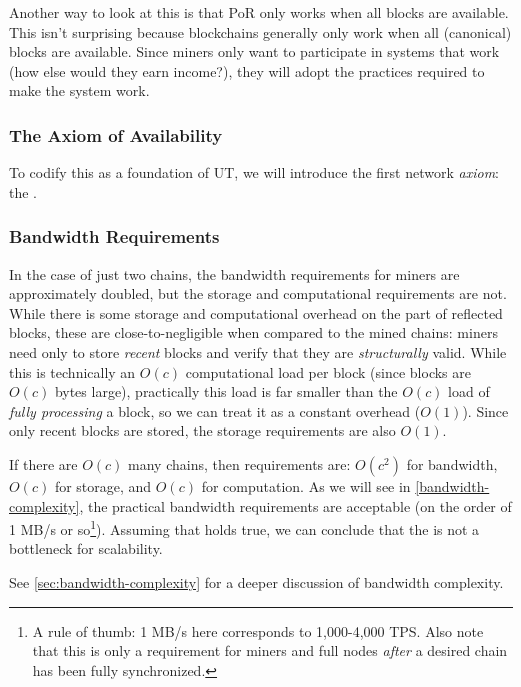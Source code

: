Another way to look at this is that PoR only works when all blocks are available.
This isn't surprising because blockchains generally only work when all (canonical) blocks are available.
Since miners only want to participate in systems that work (how else would they earn income?), they will adopt the practices required to make the system work.

\subsubsection{The Axiom of Availability}

To codify this as a foundation of UT, we will introduce the first network \emph{axiom}: the \AxiomOfAvailability{}.




\subsubsection{Bandwidth Requirements}

In the case of just two chains, the bandwidth requirements for \cL miners are approximately doubled, but the storage and computational requirements are not.
While there is some storage and computational overhead on the part of reflected \cR blocks, these are close-to-negligible when compared to the mined chains: miners need only to store \emph{recent} \cR blocks and verify that they are \emph{structurally} valid.
While this is technically an $O(c)$ computational load per block (since blocks are $O(c)$ bytes large), practically this load is far smaller than the $O(c)$ load of \emph{fully processing} a block, so we can treat it as a constant overhead ($O(1)$).
Since only recent blocks are stored, the storage requirements are also $O(1)$.

If there are $O(c)$ many chains, then requirements are: $O(c^2)$ for bandwidth, $O(c)$ for storage, and $O(c)$ for computation.
As we will see in \autoref{bandwidth-complexity}, the practical bandwidth requirements are acceptable (on the order of 1 MB/s or so\footnote{
    A rule of thumb: 1 MB/s here corresponds to 1,000-4,000 TPS.
    Also note that this is only a requirement for miners and full nodes \emph{after} a desired chain has been fully synchronized.
}).
Assuming that holds true, we can conclude that the \AxiomOfAvailability{} is not a bottleneck for scalability.

See \autoref{sec:bandwidth-complexity} for a deeper discussion of bandwidth complexity.

%
